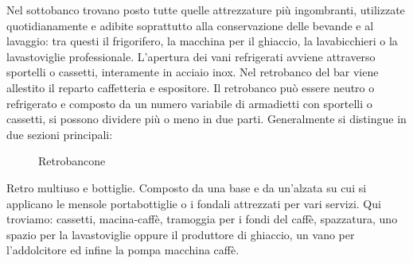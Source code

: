 Nel sottobanco trovano posto tutte quelle attrezzature più ingombranti, utilizzate quotidianamente e adibite soprattutto alla conservazione delle bevande e al lavaggio: tra questi il frigorifero, la macchina per il ghiaccio, la lavabicchieri o la lavastoviglie professionale. L'apertura dei vani refrigerati avviene attraverso sportelli o cassetti, interamente  in acciaio inox. Nel retrobanco del bar viene allestito il reparto caffetteria e espositore. Il retrobanco può essere neutro o refrigerato e composto da un numero variabile di armadietti con sportelli o cassetti, si possono dividere più o meno in due parti. Generalmente si distingue in due sezioni principali:


\begin{figure}[H]
	\captionsetup[subfloat]{farskip=2pt,captionskip=8pt}
	\centering
	\hspace{1cm}
	
	\caption{Retrobancone}
	\label{fig:imagesizes}
\end{figure}

\noindent
Retro multiuso e bottiglie.  Composto da una base e da un'alzata su cui si applicano le mensole portabottiglie o i fondali attrezzati per vari servizi. Qui troviamo: cassetti, macina-caffè,  tramoggia per i fondi del caffè, spazzatura, uno spazio per la lavastoviglie oppure il produttore di ghiaccio, un vano per l’addolcitore ed infine la pompa macchina caffè.

